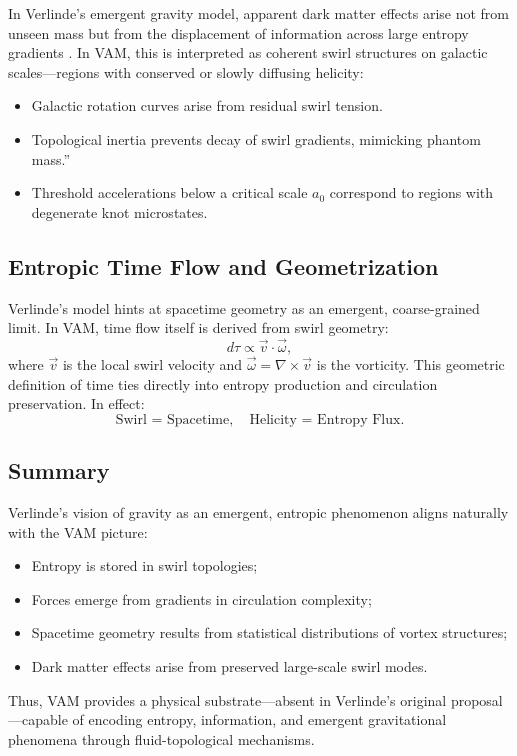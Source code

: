 In Verlinde's emergent gravity model, apparent dark matter effects arise not from unseen mass but from the displacement of information across large entropy gradients \cite{Verlinde2016}. In VAM, this is interpreted as coherent swirl structures on galactic scales—regions with conserved or slowly diffusing helicity:
\begin{itemize}
    \item Galactic rotation curves arise from residual swirl tension.
    \item Topological inertia prevents decay of swirl gradients, mimicking \grqq phantom mass.\textquotedblright
    \item Threshold accelerations below a critical scale $a_0$ correspond to regions with degenerate knot microstates.
\end{itemize}

\subsection*{Entropic Time Flow and Geometrization}

Verlinde's model hints at spacetime geometry as an emergent, coarse-grained limit. In VAM, time flow itself is derived from swirl geometry:
\begin{equation}
d\tau \propto \vec{v} \cdot \vec{\omega},
\end{equation}
where $\vec{v}$ is the local swirl velocity and $\vec{\omega} = \nabla \times \vec{v}$ is the vorticity. This geometric definition of time ties directly into entropy production and circulation preservation. In effect:
\[
\text{Swirl = Spacetime}, \quad \text{Helicity = Entropy Flux}.
\]

\subsection*{Summary}

Verlinde's vision of gravity as an emergent, entropic phenomenon aligns naturally with the VAM picture:
\begin{itemize}
    \item Entropy is stored in swirl topologies;
    \item Forces emerge from gradients in circulation complexity;
    \item Spacetime geometry results from statistical distributions of vortex structures;
    \item Dark matter effects arise from preserved large-scale swirl modes.
\end{itemize}
Thus, VAM provides a physical substrate—absent in Verlinde's original proposal—capable of encoding entropy, information, and emergent gravitational phenomena through fluid-topological mechanisms.

